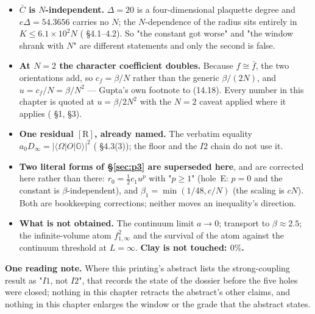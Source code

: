 \begin{itemize}[leftmargin=1.5em]
      expansion is available ( \S13.48).
\item \textbf{$\bar C$ is $N$-independent.} $\Delta=20$ is a four-dimensional plaquette degree and
      $e\Delta=54.3656$ carries no $N$; the $N$-dependence of the radius sits entirely in
      $K\le6.1\times10^{2}N$ ( \S4.1--4.2). So "the constant got worse"
      and "the window shrank with $N$" are different statements and only the second is false.
\item \textbf{At $N=2$ the character coefficient doubles.} Because $f\cong\bar f$, the two
      orientations add, so $c_f=\beta/N$ rather than the generic $\beta/(2N)$, and
      $u=c_f/N=\beta/N^2$ --- Gupta's own footnote to (14.18). Every number in this chapter is
      quoted at $u=\beta/2N^2$ with the $N=2$ caveat applied where it applies
      ( \S1, \S3).
\item \textbf{One residual $[\mathrm{R}]$, already named.} The verbatim equality
      $a_0D_\infty=|\langle\Omega|O|\mathbb{G}\rangle|^2$ ( \S4.3(3)); the floor
      and the $I2$ chain do not use it.
\item \textbf{Two literal forms of \S\ref{sec:p3} are superseded here}, and are corrected here
      rather than there: $r_0=\tfrac12c_1u^{p}$ with "$p\ge1$" (hole~E: $p=0$ and the constant is
      $\beta$-independent), and $\beta_1=\min(1/48,c/N)$ (the scaling is $cN$). Both are
      bookkeeping corrections; neither moves an inequality's direction.
\item \textbf{What is not obtained.} The continuum limit $a\to0$; transport to
      $\beta\approx2.5$; the infinite-volume atom $f_{1,\infty}^2$ and the survival of the atom
      against the continuum threshold at $L=\infty$. \textbf{Clay is not touched: $0\%$.}
\end{itemize}

\noindent\textbf{One reading note.} Where this printing's abstract lists the strong-coupling
result as "$I1$, not $I2$", that records the state of the dossier before the five holes were
closed; nothing in this chapter retracts the abstract's other claims, and nothing in this chapter
enlarges the window or the grade that the abstract states.

\endgroup
